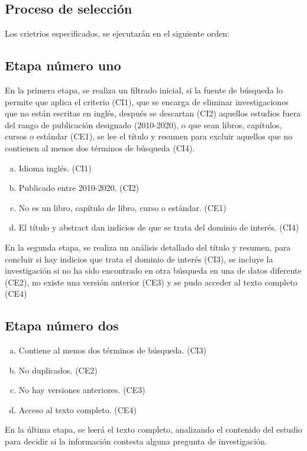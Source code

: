 \documentclass[conference,onecolumn,10pt]{IEEEtran}
\begin{document}
\subsection{Proceso de selección}
Los crietrios especificados, se ejecutarán en el siguiente orden:

\subsection{Etapa número uno}
En la primera etapa, se realiza un filtrado inicial, si la fuente de búsqueda 
lo permite que aplica el criterio (CI1), que se encarga de eliminar 
investigaciones que no están escritas en inglés, después 
se descartan (CI2) aquellos estudios fuera del rango de publicación designado (2010-2020), 
o que sean libros, capítulos, cursos o estándar (CE1), se lee el título y resumen para 
excluir aquellos que no contienen al menos dos términos de búsqueda (CI4).

\begin{enumerate}[(a)]
  \item{Idioma inglés. (CI1)}
  \item{Publicado entre 2010-2020. (CI2)}
  \item{No es un libro, capítulo de libro, curso o estándar. (CE1)}
  \item{El título y abstract dan indicios de que se trata del dominio de interés. (CI4)}
\end{enumerate}

En la segunda etapa, se realiza un análisis detallado del título y resumen, para 
concluir si hay indicios que trata el dominio de interés (CI3), se incluye 
la investigación si no ha sido encontrado en otra búsqueda en una de datos diferente (CE2), 
no existe una versión anterior (CE3) y se pudo acceder al texto completo (CE4)

\subsection{Etapa número dos}
\begin{enumerate}[(a)]
  \item{Contiene al menos dos términos de búsqueda. (CI3)}
  \item{No duplicados. (CE2)}
  \item{No hay versiones anteriores. (CE3) }
  \item{Acceso al texto completo. (CE4)}
\end{enumerate}

En la última etapa, se leerá el texto completo, analizando el contenido del estudio para decidir si 
la información contesta alguna pregunta de investigación. 
\end{document}

